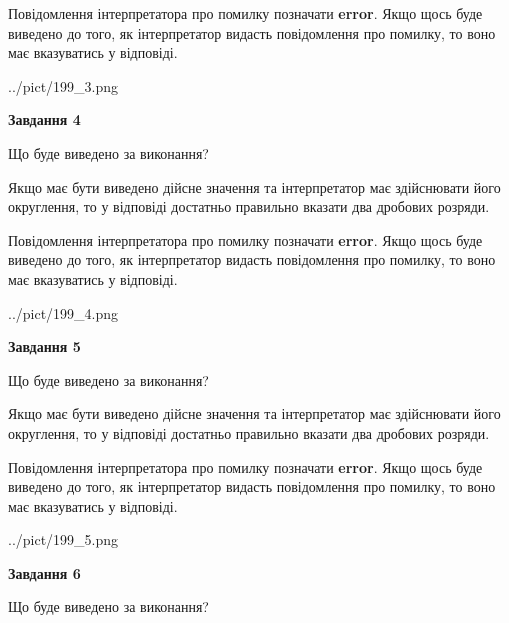 \documentclass[12pt, ukrainian]{article}
\begin{document}
{\begin {Large}
Повідомлення інтерпретатора про помилку позначати \textbf{error}.
Якщо щось буде виведено до того, як інтерпретатор видасть повідомлення про помилку, 
то воно має вказуватись у відповіді. \par

\begin{center}
	{../pict/199_3.png}
\end{center}
\newpage

{\begin {center}\textbf{Завдання 4}\end {center}}\par
Що буде виведено за виконання? \par

Якщо має бути виведено дійсне значення та інтерпретатор має здійснювати його округлення, 
то у відповіді достатньо правильно вказати два дробових розряди.

Повідомлення інтерпретатора про помилку позначати \textbf{error}.
Якщо щось буде виведено до того, як інтерпретатор видасть повідомлення про помилку, 
то воно має вказуватись у відповіді. \par

\begin{center}
	{../pict/199_4.png}
\end{center}
\newpage

{\begin {center}\textbf{Завдання 5}\end {center}}\par
Що буде виведено за виконання? \par

Якщо має бути виведено дійсне значення та інтерпретатор має здійснювати його округлення, 
то у відповіді достатньо правильно вказати два дробових розряди.

Повідомлення інтерпретатора про помилку позначати \textbf{error}.
Якщо щось буде виведено до того, як інтерпретатор видасть повідомлення про помилку, 
то воно має вказуватись у відповіді. \par

\begin{center}
	{../pict/199_5.png}
\end{center}
\newpage

{\begin {center}\textbf{Завдання 6}\end {center}}\par
Що буде виведено за виконання? \par


\end{Large}}
\end{document}
